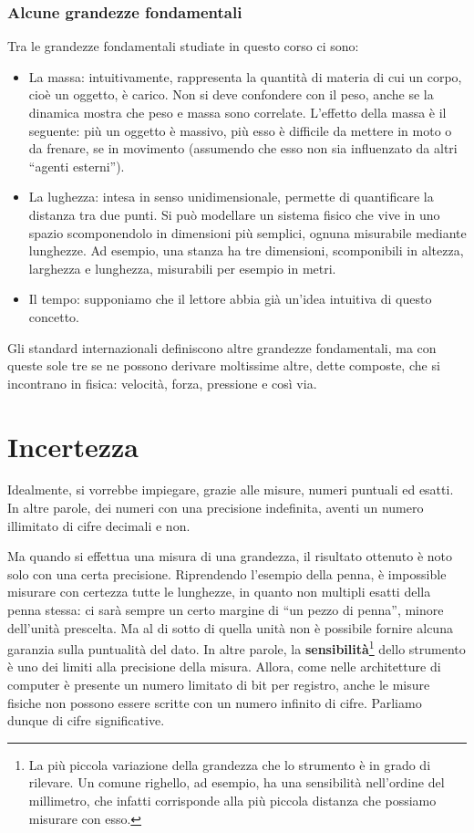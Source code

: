 \subsubsection{Alcune grandezze fondamentali}
Tra le grandezze fondamentali studiate in questo corso ci sono:
\begin{itemize}
    \item La massa: intuitivamente, rappresenta la quantità di
    materia di cui un corpo, cioè un oggetto, è carico. Non si
    deve confondere con il peso, anche se la dinamica mostra che
    peso e massa sono correlate. L'effetto della massa è il seguente:
    più un oggetto è massivo, più
    esso è difficile da mettere in moto o da frenare, se in
    movimento (assumendo che esso non sia influenzato da altri
    ``agenti esterni'').

    \item La lughezza: intesa in senso unidimensionale, permette
    di quantificare la distanza tra due punti. Si può modellare
    un sistema fisico che vive in uno spazio scomponendolo in
    dimensioni più semplici, ognuna misurabile mediante lunghezze.
    Ad esempio, una stanza ha tre dimensioni, scomponibili in
    altezza, larghezza e lunghezza, misurabili per esempio in
    metri.

    \item Il tempo: supponiamo che il lettore abbia già un'idea
    intuitiva di questo concetto.
\end{itemize}

\noindent Gli standard internazionali definiscono altre grandezze
fondamentali, ma con queste sole tre se ne possono derivare moltissime
altre, dette composte, che si incontrano in fisica: velocità, forza,
pressione e così via.

\section{Incertezza}
Idealmente, si vorrebbe impiegare, grazie alle misure, numeri puntuali ed esatti.
In altre parole, dei numeri con una precisione indefinita, aventi un numero
illimitato di cifre decimali e non.

Ma quando si effettua una misura di una grandezza, il risultato ottenuto è noto solo
con una certa precisione. Riprendendo l'esempio della penna, è impossible
misurare con certezza tutte le lunghezze, in quanto non multipli esatti della
penna stessa: ci sarà sempre un certo margine di ``un pezzo di penna'',
minore dell'unità prescelta. Ma al di sotto di quella unità non è possibile
fornire alcuna garanzia sulla puntualità del dato. In altre parole, la
\textbf{sensibilità}\footnote{La più piccola variazione della grandezza che lo
strumento è in grado di rilevare. Un comune righello, ad esempio, ha una
sensibilità nell'ordine del millimetro, che infatti corrisponde alla più
piccola distanza che possiamo misurare con esso.} dello strumento è uno dei limiti alla precisione
della misura. Allora, come nelle architetture di computer è presente un
numero limitato di bit per registro, anche le misure fisiche non possono
essere scritte con un numero infinito di cifre. Parliamo dunque di cifre
significative.

